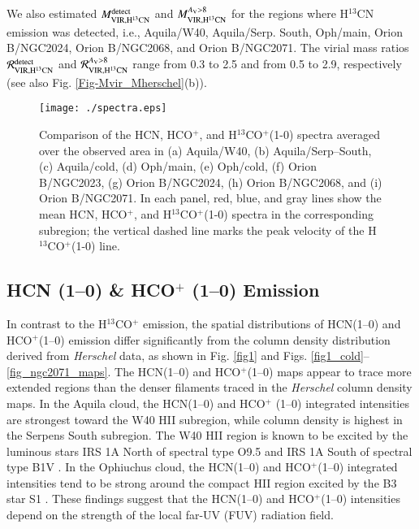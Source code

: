 \documentclass{aa}
\begin{document}
We also estimated $M_{\rm VIR,H^{13}CN}^{\rm detect}$ and $M_{\rm VIR,H^{13}CN}^{A_{\rm V}>8}$ for the regions 
where H$^{13}$CN emission was detected, i.e.,  Aquila/W40, Aquila/Serp. South, Oph/main,  Orion B/NGC2024, Orion B/NGC2068, and Orion B/NGC2071. 
The virial mass ratios $\mathcal{R}_{\rm VIR,H^{13}CN}^{\rm detect}$ and $\mathcal{R}_{\rm VIR,H^{13}CN}^{A_{\rm V}>8}$ range  
from 0.3 to 2.5 and from 0.5 to 2.9, respectively (see also Fig. \ref{Fig-Mvir_Mherschel}(b)). 





\begin{figure*}
\begin{center}
\texttt{[image: ./spectra.eps]}
\caption{Comparison of the HCN, HCO$^+$, and H$^{13}$CO$^+$(1-0) spectra averaged over the observed area in (a) Aquila/W40, (b) Aquila/Serp--South, (c) Aquila/cold, (d) Oph/main, (e) Oph/cold, (f) Orion B/NGC2023, (g) Orion B/NGC2024, (h) Orion B/NGC2068, and (i) Orion B/NGC2071. In each panel, red, blue, and gray lines show the mean HCN, HCO$^+$, and H$^{13}$CO$^+$(1-0) spectra in the corresponding subregion; the vertical dashed line marks the peak velocity of the H$^{13}$CO$^+$(1-0) line.}
\label{fig_spectra}
\end{center}
\end{figure*}



\subsection{HCN (1--0) \& HCO$^+$ (1--0) Emission}\label{sect:HCN-HCO+}





In contrast to the H$^{13}$CO$^+$ emission, the spatial distributions of HCN(1--0) and HCO$^{+}$(1--0) emission differ significantly from 
the column density distribution derived from {\it Herschel} data, as shown in Fig. \ref{fig1} and Figs. \ref{fig1_cold}--\ref{fig_ngc2071_maps}. 
The HCN(1--0) and HCO$^+$(1--0) maps appear to trace more extended regions than the denser filaments traced in 
the {\it Herschel} column density maps. In the Aquila cloud, the HCN(1--0) and HCO$^+$ (1--0) integrated intensities are strongest 
toward the W40 H{\small II} subregion, while column density is highest in the Serpens South subregion.  
The W40 H{\small II} region is known to be excited by the luminous stars IRS 1A North of spectral type O9.5 and IRS 1A South of spectral type B1V \citep{Shuping12}. 
In the Ophiuchus cloud, the HCN(1--0) and HCO$^+$(1--0) integrated intensities tend to be strong around the compact H{\small II} region excited by the B3 star S1 \citep{Grasdalen73,Andre88}. These findings suggest that  the HCN(1--0) and HCO$^+$(1--0) intensities depend on the strength of the local far-UV (FUV) 
radiation field.
\end{document}
